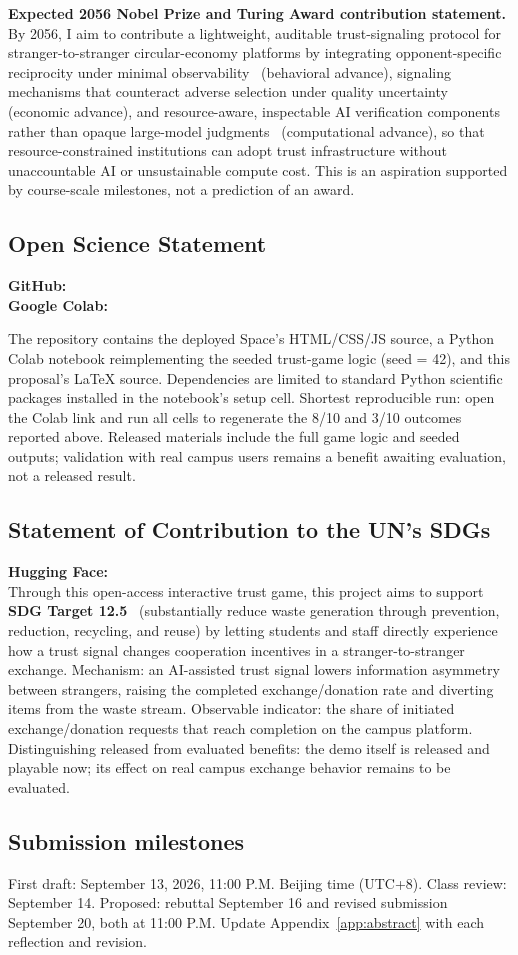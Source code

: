 \noindent\textbf{Expected 2056 Nobel Prize and Turing Award contribution statement.}
By 2056, I aim to contribute a lightweight, auditable trust-signaling protocol for stranger-to-stranger circular-economy platforms by integrating opponent-specific reciprocity under minimal observability~\cite{morozovfeigel2026} (behavioral advance), signaling mechanisms that counteract adverse selection under quality uncertainty~\cite{akerlof1970} (economic advance), and resource-aware, inspectable AI verification components rather than opaque large-model judgments~\cite{leungetal2026} (computational advance), so that resource-constrained institutions can adopt trust infrastructure without unaccountable AI or unsustainable compute cost. This is an aspiration supported by course-scale milestones, not a prediction of an award.

\subsection*{Open Science Statement}
\textbf{GitHub:} \GitHubLink\\
\textbf{Google Colab:} \ColabLink\par
The repository contains the deployed Space's HTML/CSS/JS source, a Python Colab notebook reimplementing the seeded trust-game logic (seed = 42), and this proposal's LaTeX source. Dependencies are limited to standard Python scientific packages installed in the notebook's setup cell. Shortest reproducible run: open the Colab link and run all cells to regenerate the 8/10 and 3/10 outcomes reported above. Released materials include the full game logic and seeded outputs; validation with real campus users remains a benefit awaiting evaluation, not a released result.

\subsection*{Statement of Contribution to the UN's SDGs}
\textbf{Hugging Face:} \DemoLink\\
Through this open-access interactive trust game, this project aims to support \textbf{SDG Target 12.5}~\cite{sdg12} (substantially reduce waste generation through prevention, reduction, recycling, and reuse) by letting students and staff directly experience how a trust signal changes cooperation incentives in a stranger-to-stranger exchange. Mechanism: an AI-assisted trust signal lowers information asymmetry between strangers, raising the completed exchange/donation rate and diverting items from the waste stream. Observable indicator: the share of initiated exchange/donation requests that reach completion on the campus platform. Distinguishing released from evaluated benefits: the demo itself is released and playable now; its effect on real campus exchange behavior remains to be evaluated.

\subsection*{Submission milestones}
First draft: September 13, 2026, 11:00 P.M. Beijing time (UTC+8). Class review: September 14. Proposed: rebuttal September 16 and revised submission September 20, both at 11:00 P.M. Update Appendix~\ref{app:abstract} with each reflection and revision.
